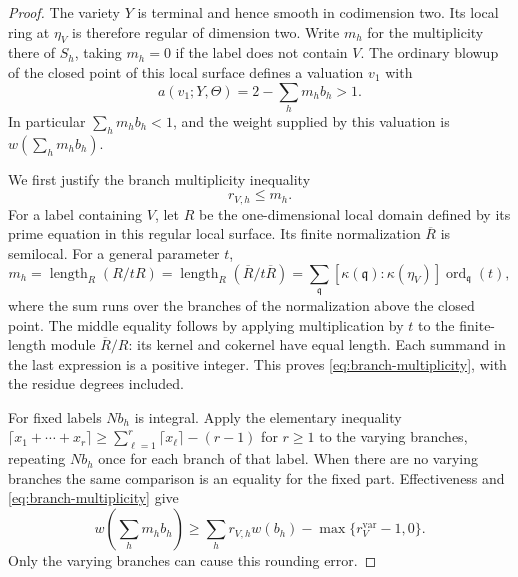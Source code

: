 \begin{proof}
The variety \(Y\) is terminal and hence smooth in codimension two.
Its local ring at \(\eta_V\) is therefore regular of dimension two.
Write \(m_h\) for the multiplicity there of \(S_h\), taking
\(m_h=0\) if the label does not contain \(V\).  The ordinary
blowup of the closed point of this local surface defines a valuation
\(v_1\) with
\begin{equation}
\label{eq:surface-first-blowup}
 a(v_1;Y,\Theta)=2-\sum_hm_hb_h>1.
\end{equation}
In particular \(\sum_hm_hb_h<1\), and the weight supplied by this
valuation is \(w(\sum_hm_hb_h)\).

We first justify the branch multiplicity inequality
\begin{equation}
\label{eq:branch-multiplicity}
 r_{V,h}\leq m_h.
\end{equation}
For a label containing \(V\), let \(R\) be the one-dimensional
local domain defined by its prime equation in this regular local
surface.  Its finite normalization \(\overline R\) is semilocal.
For a general parameter \(t\),
\[
 m_h=\operatorname{length}_R(R/tR)
     =\operatorname{length}_R(\overline R/t\overline R)
     =\sum_{\mathfrak q}
       [\kappa(\mathfrak q):\kappa(\eta_V)]
       \operatorname{ord}_{\mathfrak q}(t),
\]
where the sum runs over the branches of the normalization above the
closed point.  The middle equality follows by applying multiplication
by \(t\) to the finite-length module \(\overline R/R\): its kernel
and cokernel have equal length.  Each summand in the last expression
is a positive integer.  This proves
\eqref{eq:branch-multiplicity}, with the residue degrees included.

For fixed labels \(Nb_h\) is integral.  Apply the elementary
inequality
\(\lceil x_1+\cdots+x_r\rceil\geq
\sum_{\ell=1}^r\lceil x_\ell\rceil-(r-1)\) for \(r\geq1\)
to the varying branches, repeating \(Nb_h\) once for each branch
of that label.  When there are no varying branches the same comparison
is an equality for the fixed part.  Effectiveness and
\eqref{eq:branch-multiplicity} give
\begin{equation}
\label{eq:first-default-error}
 w\left(\sum_hm_hb_h\right)
 \geq \sum_h r_{V,h}w(b_h)
       -\max\{r_V^{\mathrm{var}}-1,0\}.
\end{equation}
Only the varying branches can cause this rounding error.


\end{proof}
